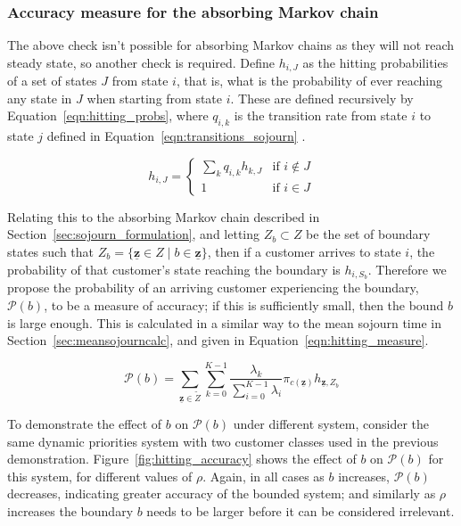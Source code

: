 \documentclass{article}
\begin{document}
\subsubsection{Accuracy measure for the absorbing Markov chain}\label{sec:absorbing_accuracy}
The above check isn't possible for absorbing Markov chains as they will not
reach steady state, so another check is required. Define $h_{i,J}$ as
the hitting probabilities of a set of states $J$ from state $i$, that is, what
is the probability of ever reaching any state in $J$ when starting from state
$i$. These are defined recursively by Equation~\ref{eqn:hitting_probs}, where
$q_{i,k}$ is the transition rate from state $i$ to state $j$ defined in
Equation~\ref{eqn:transitions_sojourn} \cite{privault13}.

\begin{equation}\label{eqn:hitting_probs}
h_{i,J} = \begin{cases}
\sum_k q_{i,k} h_{k,J} & \text{if } i \notin J \\
1 & \text{if } i \in J
\end{cases}
\end{equation}

Relating this to the absorbing Markov chain described in
Section~\ref{sec:sojourn_formulation}, and letting $Z_b \subset Z$ be the set of
boundary states such that
$Z_b = \{\underline{\mathbf{z}} \in Z \; | \; b \in \underline{\mathbf{z}}\}$,
then if a customer arrives to state $i$, the probability of that customer's
state reaching the boundary is $h_{i,S_b}$. Therefore we propose the probability
of an arriving customer experiencing the boundary, $\mathcal{P}(b)$, to be a
measure of accuracy; if this is sufficiently small, then the bound $b$ is large
enough. This is calculated in a similar way to the mean sojourn time in
Section~\ref{sec:meansojourncalc}, and given in Equation~\ref{eqn:hitting_measure}.

\begin{equation}\label{eqn:hitting_measure}
\mathcal{P}(b) = \sum_{\underline{\mathbf{z}} \in \tilde{Z}} \sum_{k=0}^{K-1} \frac{\lambda_k}{\sum_{i=0}^{K-1} \lambda_i} \pi_{c(\underline{\mathbf{z}})} h_{\underline{\mathbf{z}}, Z_b}
\end{equation}

To demonstrate the effect of $b$ on $\mathcal{P}(b)$ under different system,
consider the same dynamic priorities system with two customer classes used in
the previous demonstration. Figure~\ref{fig:hitting_accuracy} shows the effect
of $b$ on $\mathcal{P}(b)$ for this system, for different values of $\rho$.
Again, in all cases as $b$ increases, $\mathcal{P}(b)$ decreases, indicating
greater accuracy of the bounded system; and similarly as $\rho$ increases the
boundary $b$ needs to be larger before it can be considered irrelevant.
\end{document}
